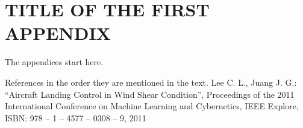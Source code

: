 \documentclass[a4paper, 12pt]{report}
\begin{document}
\appendix

\chapter{TITLE OF THE FIRST APPENDIX}
The appendices start here.

\begin{thebibliography}{9}
 References in the order they are mentioned in the text.
 Lee C. L., Juang J. G.: “Aircraft Landing Control in Wind Shear Condition”,
Proceedings of the 2011 International Conference on Machine Learning and
Cybernetics, IEEE Explore, ISBN: 978 – 1 – 4577 – 0308 – 9, 2011

\end{thebibliography}
\end{document}

